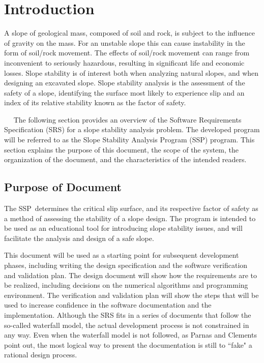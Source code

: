 \documentclass[12pt]{article}
\newcommand{\progname}{SSP}
\begin{document}
\section{Introduction}

A slope of geological mass, composed of soil and rock, is subject to the
 influence of gravity on the mass. For an unstable slope this can cause 
instability in the form of soil/rock movement. The effects of soil/rock 
movement can range from inconvenient to seriously hazardous, resulting
 in significant life and economic losses. Slope stability is of interest both 
when analyzing natural slopes, and when designing an excavated slope. 
Slope stability analysis is the assessment of the safety of a slope, identifying 
the surface most likely to experience slip and an index of its relative stability 
known as the factor of safety.

~\newline~\newline 
The following section provides an overview of the Software Requirements 
Specification (SRS) for a slope stability analysis problem. The developed 
program will be referred to as the Slope Stability Analysis Program (\progname) program. 
This section explains the purpose of this document, the scope of the system, 
the organization of the document, and the characteristics of the intended readers.
\subsection{Purpose of Document}

The \progname\ determines the critical slip surface, and its respective factor of safety
 as a method of assessing the stability of a slope design. The program is intended to
 be used as an educational tool for introducing slope stability issues, and will
 facilitate the analysis and design of a safe slope.

This document will be used as a starting point for subsequent development 
phases, including writing the design specification and the software verification
 and validation plan. The design document will show how the requirements
 are to be realized, including decisions on the numerical algorithms and 
programming environment. The verification and validation plan will show
 the steps that will be used to increase confidence in the software documentation
 and the implementation. Although the SRS fits in a series of documents 
that follow the so-called waterfall model, the actual development process
 is not constrained in any way. Even when the waterfall model is not followed, 
as Parnas and Clements point out, the most logical way to present the documentation
 is still to ``fake" a rational design process.
\end{document}
